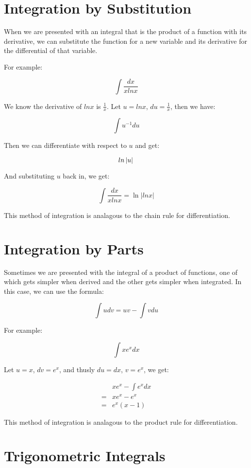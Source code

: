 \documentclass{article}
\begin{document}
\section{Integration by Substitution}

When we are presented with an integral that is the product of a
function with its derivative, we can substitute the function for a new
variable and its derivative for the differential of that variable.

For example:

\[
\int \frac{dx}{xlnx}
\]

We know the derivative of $lnx$ is $\frac{1}{x}$.  Let $u=lnx$,
$du=\frac{1}{x}$, then we have:

\[
\int u^{-1}du
\]

Then we can differentiate with respect to $u$ and get:

\[
ln \left| u \right| \\
\]

And substituting $u$ back in, we get:

\[
\int \frac{dx}{xlnx} = \ln \left| lnx \right|
\]

This method of integration is analagous to the chain rule for
differentiation.

\section{Integration by Parts}

Sometimes we are presented with the integral of a product of
functions, one of which gets simpler when derived and the other gets
simpler when integrated.  In this case, we can use the formula:

\[
\int udv = uv - \int vdu
\]

For example:

\[
\int xe^xdx
\]

Let $u = x$, $dv = e^x$, and thusly $du = dx$, $v = e^x$, we get:

\begin{align*}
  &xe^x - \int e^xdx \\
  = &xe^x - e^x \\
  = &e^x(x-1)
\end{align*}

This method of integration is analagous to the product rule for
differentiation.

\section{Trigonometric Integrals}
\end{document}
